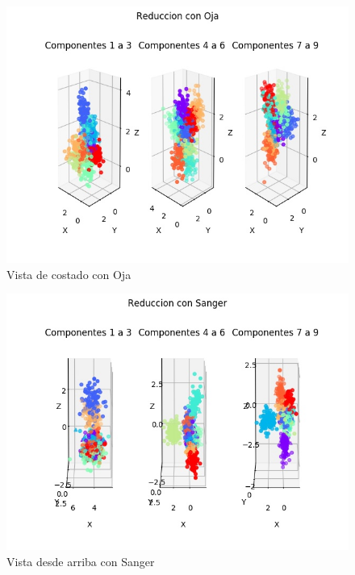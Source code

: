 \begin{figure}[H]
  \includegraphics[width=160mm]{imagenes/reduccion_Oja_3.jpg}
  \caption{Vista de costado con Oja}
\end{figure}

\begin{figure}[H]
  \includegraphics[width=160mm]{imagenes/reduccion_Sanger_1.jpg}
  \caption{Vista desde arriba con Sanger}
\end{figure}

